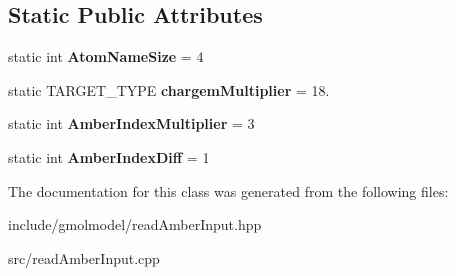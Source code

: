 \subsection*{Static Public Attributes}
\begin{DoxyCompactItemize}
\item 
static int {\bfseries Atom\+Name\+Size} = 4\hypertarget{classreadAmberInput_a7f06918a270a5457fcc96244e82185b6}{}\label{classreadAmberInput_a7f06918a270a5457fcc96244e82185b6}

\item 
static T\+A\+R\+G\+E\+T\+\_\+\+T\+Y\+PE {\bfseries chargem\+Multiplier} = 18.\hypertarget{classreadAmberInput_afbcfd68c2eb24417da83099d143a8b54}{}\label{classreadAmberInput_afbcfd68c2eb24417da83099d143a8b54}

\item 
static int {\bfseries Amber\+Index\+Multiplier} = 3\hypertarget{classreadAmberInput_a22afe0bb5cdc791dde1f3b8b921ddcdf}{}\label{classreadAmberInput_a22afe0bb5cdc791dde1f3b8b921ddcdf}

\item 
static int {\bfseries Amber\+Index\+Diff} = 1\hypertarget{classreadAmberInput_abf3123b985955d176e97893c83b72258}{}\label{classreadAmberInput_abf3123b985955d176e97893c83b72258}

\end{DoxyCompactItemize}


The documentation for this class was generated from the following files\+:\begin{DoxyCompactItemize}
\item 
include/gmolmodel/read\+Amber\+Input.\+hpp\item 
src/read\+Amber\+Input.\+cpp\end{DoxyCompactItemize}
